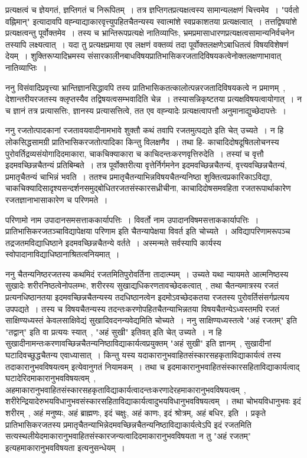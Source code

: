 	प्रत्यक्षत्वं च ज्ञेयगतं, ज्ञप्तिगतं च निरूपितम्~। तत्र ज्ञप्तिगतप्रत्यक्षत्वस्य सामान्यलक्षणं चित्त्वमेव~। "पर्वतो वह्निमान्" इत्यादावपि वह्न्याद्याकारवृत्त्युपहितचैतन्यस्य स्वात्मांशे स्वप्रकाशतया प्रत्यक्षत्वात्~। तत्तद्विषयांशे प्रत्यक्षत्वन्तु पूर्वोक्तमेव~। तस्य च भ्रान्तिरूपप्रत्यक्षे नातिव्याप्तिः, भ्रमप्रमासाधारणप्रत्यक्षत्वसामान्यनिर्वचनेन तस्यापि लक्ष्यत्वात्~। यदा तु प्रत्यक्षप्रमाया एव लक्षणं वक्तव्यं तदा पूर्वोक्तलक्षणेऽबाधितत्वं विषयविशेषणं देयम्~। शुक्तिरूप्यादिभ्रमस्य संसारकालीनबाधविषयप्रातिभासिकरजतादिविषयकत्वेनोक्तलक्षणाभावात् नातिव्याप्तिः~।\par
	ननु विसंवादिप्रवृत्त्या भ्रान्तिज्ञानसिद्धावपि तस्य प्रातिभासिकतत्कालोत्पन्नरजतादिविषयकत्वे न प्रमाणम्~, देशान्तरीयरजतस्य क्लृप्तस्यैव तद्विषयत्वसम्भवादिति चेन्न~। तस्यासन्निकृष्टतया प्रत्यक्षविषयत्वायोगात्~। न च ज्ञानं तत्र प्रत्यासत्तिः, ज्ञानस्य प्रत्यासत्तित्वे, तत एव वह्न्यादेः प्रत्यक्षत्वापत्तौ अनुमानाद्युच्छेदापत्तेः~।\par
	ननु रजतोत्पादकानां रजतावयवादीनामभावे शुक्तौ कथं तवापि रजतमुत्पद्यते इति चेत् उच्यते~। न हि लोकसिद्धसामग्री प्रातिभासिकरजतोत्पादिका किन्तु विलक्षणैव~। तथा हि- काचादिदोषदूषितलोचनस्य पुरोवर्तिद्रव्यसंयोगादिदमाकारा, चाकचिक्याकारा च काचिदन्तःकरणवृत्तिरुदेति~। तस्यां च वृत्तौ इदमवच्छिन्नचैतन्यं प्रतिबिम्बते~। तत्र पूर्वोक्तरीत्या वृत्तेर्निर्गमनेन इदमवच्छिन्नचैतन्यं, वृत्त्यवच्छिन्नचैतन्यं, प्रमातृचैतन्यं चाभिन्नं भवति~। ततश्च प्रमातृचैतन्याभिन्नविषयचैतन्यनिष्ठा शुक्तित्वप्रकारिकाऽविद्या, चाकचिक्यादिसादृश्यसन्दर्शनसमुद्बोधितरजतसंस्कारसध्रीचीना, काचादिदोषसमवहिता रजतरूपार्थाकारेण रजतज्ञानाभासाकारेण च परिणमते~।\par
	परिणामो नाम उपादानसमसत्ताककार्यापत्तिः~। विवर्तो नाम उपादानविषमसत्ताककार्यापत्तिः~। प्रातिभासिकरजतञ्चाविद्यापेक्षया परिणाम इति चैतन्यापेक्षया विवर्त इति चोच्यते~। अविद्यापरिणामरूपञ्च तद्रजतमविद्याधिष्ठाने इदमवच्छिन्नचैतन्ये वर्तते~। अस्मन्मते सर्वस्यापि कार्यस्य स्वोपादानाविद्याधिष्ठानाश्रितत्वनियमात्~।\par
	ननु चैतन्यनिष्ठरजतस्य कथमिदं रजतमितिपुरोवर्तिना तादात्म्यम्~। उच्यते यथा न्यायमते आत्मनिष्ठस्य सुखादेः शरीरनिष्ठत्वेनोपलम्भः, शरीरस्य सुखाद्यधिकरणतावच्छेदकत्वात्~, तथा चैतन्यमात्रस्य रजतं प्रत्यनधिष्ठानतया इदमवच्छिन्नचैतन्यस्य तदधिष्ठानत्वेन इदमोऽवच्छेदकतया रजतस्य पुरोवर्तिसंसर्गप्रत्यय उपपद्यते~। तस्य च विषयचैतन्यस्य तदन्तःकरणोपहितचैतन्याभिन्नतया विषयचैतन्येऽध्यस्तमपि रजतं साक्षिण्यध्यस्तं केवलसाक्षिवेद्यं सुखादिवदनन्यवेद्यमिति चोच्यते~। ननु साक्षिण्यध्यस्तत्वे "अहं रजतम्" इति "तद्वान्" इति वा प्रत्ययः स्यात्~, "अहं सुखी" इतिवत् इति चेत् उच्यते~। न हि सुखादीनामन्तःकरणावच्छिन्नचैतन्यनिष्ठाविद्याकार्यत्वप्रयुक्तम् "अहं सुखी" इति ज्ञानम्~, सुखादीनां घटादिवच्छुद्धचैतन्य एवाध्यासात्~। किन्तु यस्य यदाकारानुभवाहितसंस्कारसहकृताविद्याकार्यत्वं तस्य तदाकारानुभवविषयत्वम् इत्येवानुगतं नियामकम्~। तथा च इदमाकारानुभवाहितसंस्कारसहिताविद्याकार्यत्वाद् घटादेरिदमाकारानुभवविषयत्वम्~, अहमाकारानुभवाहितसंस्कारसहकृताविद्याकार्यत्वादन्तःकरणादेरहमाकारानुभवविषयत्वम्~, शरीरेन्द्रियादेरुभयविधानुभवसंस्कारसहिताविद्याकार्यत्वादुभयविधानुभवविषयत्वम्~। तथा चोभयविधानुभवः इदं शरीरम्~, अहं मनुष्यः, अहं ब्राह्मणः, इदं चक्षुः, अहं काणः, इदं श्रोत्रम्, अहं बधिर, इति~। प्रकृते प्रातिभासिकरजतस्य प्रमातृचैतन्याभिन्नेदमवच्छिन्नचैतन्यनिष्ठाविद्याकार्यत्वेऽपि इदं रजतमिति सत्यस्थलीयेदमाकारानुभवाहितसंस्कारजन्यत्वादिदमाकारानुभवविषयता न तु "अहं रजतम्" इत्यहमाकारानुभवविषयता इत्यनुसन्धेयम्~। \par
